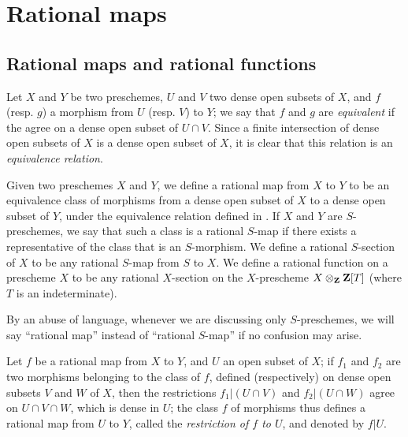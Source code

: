 \section{Rational maps}
\label{section-rational-maps}

\subsection{Rational maps and rational functions}
\label{subsection-rational-maps-and-rational-functions}

\begin{env}[7.1.1]
\label{1.7.1.1}
Let $X$ and $Y$ be two preschemes, $U$ and $V$ two dense open subsets of $X$, and $f$ (resp. $g$) a morphism from $U$ (resp. $V$) to $Y$; we say that $f$ and $g$ are \emph{equivalent} if the agree on a dense open subset of $U\cap V$.
Since a finite intersection of dense open subsets of $X$ is a dense open subset of $X$, it is clear that this relation is an \emph{equivalence relation}.
\end{env}

\begin{defn}[7.1.2]
\label{1.7.1.2}
Given two preschemes $X$ and $Y$, we define a rational map from $X$ to $Y$ to be an equivalence class of morphisms from a dense open subset of $X$ to a dense open subset of $Y$, under the equivalence relation defined in .
If $X$ and $Y$ are $S$-preschemes, we say that such a class is a rational $S$-map if there exists a representative of the class that is an $S$-morphism.
We define a rational $S$-section of $X$ to be any rational $S$-map from $S$ to $X$.
We define a rational function on a prescheme $X$ to be any rational $X$-section on the $X$-prescheme $X\otimes_{\mathbf{Z}}\mathbf{Z}[T]$ (where $T$ is an indeterminate).
\end{defn}

By an abuse of language, whenever we are discussing only $S$-preschemes, we will say ``rational map'' instead of ``rational $S$-map'' if no confusion may arise.

Let $f$ be a rational map from $X$ to $Y$, and $U$ an open subset of $X$; if $f_1$ and $f_2$ are two morphisms belonging to the class of $f$, defined (respectively) on dense open subsets $V$ and $W$ of $X$, then the restrictions $f_1|(U\cap V)$ and $f_2|(U\cap W)$ agree on $U\cap V\cap W$, which is dense in $U$; the class $f$ of morphisms thus defines a rational map from $U$ to $Y$, called the \emph{restriction of $f$ to $U$}, and denoted by $f|U$.

